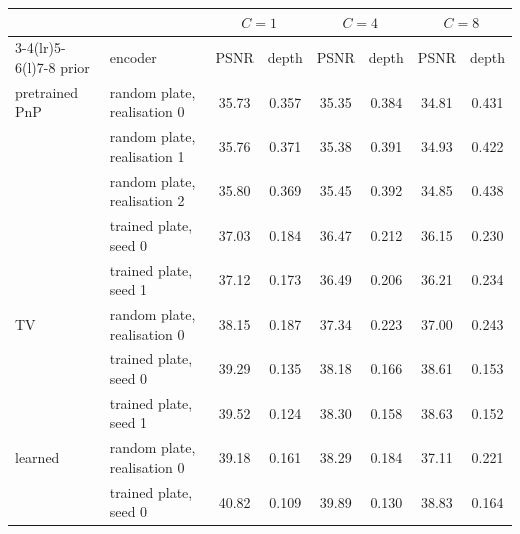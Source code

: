 \begin{tabular}{@{}ll cc cc cc@{}}\toprule
 & & \multicolumn{2}{c}{$C=1$} & \multicolumn{2}{c}{$C=4$} & \multicolumn{2}{c}{$C=8$}\\
\cmidrule(lr){3-4}\cmidrule(lr){5-6}\cmidrule(l){7-8}
prior & encoder & PSNR & depth & PSNR & depth & PSNR & depth\\\midrule
pretrained PnP & random plate, realisation 0 & 35.73 & 0.357 & 35.35 & 0.384 & 34.81 & 0.431\\
 & random plate, realisation 1 & 35.76 & 0.371 & 35.38 & 0.391 & 34.93 & 0.422\\
 & random plate, realisation 2 & 35.80 & 0.369 & 35.45 & 0.392 & 34.85 & 0.438\\
 & trained plate, seed 0 & 37.03 & 0.184 & 36.47 & 0.212 & 36.15 & 0.230\\
 & trained plate, seed 1 & 37.12 & 0.173 & 36.49 & 0.206 & 36.21 & 0.234\\
\midrule
TV & random plate, realisation 0 & 38.15 & 0.187 & 37.34 & 0.223 & 37.00 & 0.243\\
 & trained plate, seed 0 & 39.29 & 0.135 & 38.18 & 0.166 & 38.61 & 0.153\\
 & trained plate, seed 1 & 39.52 & 0.124 & 38.30 & 0.158 & 38.63 & 0.152\\
\midrule
learned & random plate, realisation 0 & 39.18 & 0.161 & 38.29 & 0.184 & 37.11 & 0.221\\
 & trained plate, seed 0 & 40.82 & 0.109 & 39.89 & 0.130 & 38.83 & 0.164\\
\bottomrule\end{tabular}
